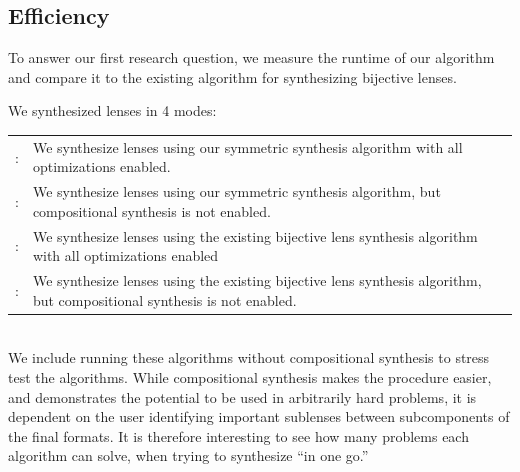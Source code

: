 \documentclass[acmsmall,screen,anonymous]{acmart}
\begin{document}

\subsection{Efficiency}

To answer our first research question, we measure the runtime of our algorithm
and compare it to the existing algorithm for synthesizing bijective
lenses.

We synthesized lenses in 4 modes:

\begin{tabulary}{\linewidth}{rL}
  \SSOpt{}: & We synthesize lenses using our symmetric synthesis algorithm with all optimizations enabled.\\
  \SSNCOpt{}: & We synthesize lenses using our symmetric synthesis algorithm,
                but compositional synthesis is not enabled.\\
  \BSOpt{}: &  We synthesize lenses using the existing bijective lens synthesis
              algorithm with all optimizations enabled\\
  \BSNCOpt{}: & We synthesize lenses using the existing bijective lens synthesis
                algorithm, but compositional synthesis is not enabled.\\
\end{tabulary}\\

We include running these algorithms without compositional synthesis to stress
test the algorithms. While compositional synthesis makes the procedure easier,
and demonstrates the potential to be used in arbitrarily hard problems, it is
dependent on the user identifying important sublenses between subcomponents of
the final formats. It is therefore interesting to see how many problems each
algorithm can solve, when trying to synthesize ``in one go.''
\end{document}
